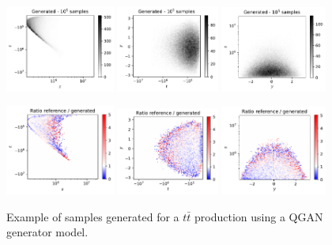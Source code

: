 \documentclass[twocolumn,preprintnumbers,superscriptaddress]{revtex4-2}
\begin{document}
\begin{figure}
  \includegraphics[width=0.32\textwidth]{plots/LHCttbar/s-t_FAKE_100k.pdf}%
  \includegraphics[width=0.3\textwidth]{plots/LHCttbar/t-y_FAKE_100k.pdf}%
  \includegraphics[width=0.31\textwidth]{plots/LHCttbar/y-s_FAKE_100k.pdf}

  \includegraphics[width=0.32\textwidth]{plots/LHCttbar/s-t_RATIO_100k.pdf}%
  \includegraphics[width=0.3\textwidth]{plots/LHCttbar/t-y_RATIO_100k.pdf}%
  \includegraphics[width=0.31\textwidth]{plots/LHCttbar/y-s_RATIO_100k.pdf}

  \caption{\label{fig:3dgauss}Example of samples generated for a $t\bar{t}$
    production using a QGAN generator model.}
\end{figure}
\end{document}
